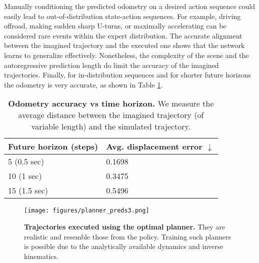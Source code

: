 Manually conditioning the predicted odometry on a desired action sequence could easily lead to out-of-distribution state-action sequences. For example, driving offroad, making sudden sharp U-turns, or maximally accelerating can be considered rare events within the expert distribution. The accurate alignment between the imagined trajectory and the executed one shows that the network learns to generalize effectively. Nonetheless, the complexity of the scene and the autoregressive prediction length do limit the accuracy of the imagined trajectories. Finally, for in-distribution sequences and for shorter future horizons the odometry is very accurate, as shown in Table \ref{table: odometry_accuracy}.

\begin{table}[h]
    \small
    \centering
    \begin{tabular}[width=\textwidth]{ p{} | p{} } \toprule[1.5pt]
         \textbf{Future horizon (steps)} & Avg. displacement error $\downarrow$  \\
         \midrule[1pt]
         5 (0.5 sec) & 0.1698 \\
         10 (1 sec) & 0.3475 \\   
         15 (1.5 sec) & 0.5496 \\       
         \bottomrule[1.5pt]
    \end{tabular}
    \captionsetup{aboveskip=0.3cm, belowskip=-0.3cm}
    \caption{\textbf{Odometry accuracy vs time horizon.} We measure the average distance between the imagined trajectory (of variable length) and the simulated trajectory. }
    \label{table: odometry_accuracy}
\end{table}


\begin{figure*}[t]
    \centering
    \texttt{[image: figures/planner\_preds3.png]}
    \captionsetup{belowskip=-0.35cm, aboveskip=0.2cm}
    \caption{\textbf{Trajectories executed using the optimal planner.} They are realistic and resemble those from the policy. Training such planners is possible due to the analytically available dynamics and inverse kinematics.}
    \label{fig: planner_trajectories}
\end{figure*}

